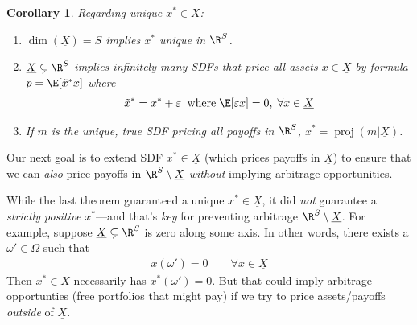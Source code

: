 \documentclass[12pt]{article}
\theoremstyle{plain}
\newtheorem{cor}[thm]{Corollary}
\theoremstyle{definition}
\theoremstyle{remark}
\newcommand{\proj}{\operatorname{proj}}
\begin{document}
\begin{multicols*}{2}
\begin{cor}
Regarding unique $x^*\in \underline{X}$:
\begin{enumerate}[label=\emph{(\roman*)}]
  \item $\dim(\underline{X})=S$ implies $x^*$ unique in $\R^S$.
  \item $\underline{X}\subsetneq \R^S$ implies infinitely many
    SDFs that price all assets $x\in\underline{X}$ by
    formula $p=\E[\tilde{x}^*x]$ where
    \begin{align*}
      \tilde{x}^*
      = x^* + \varepsilon
      \;\;
      \text{where}\;
      \E[\varepsilon x] = 0,
      \; \forall x\in\underline{X}
    \end{align*}
  \item If $m$ is the unique, true SDF pricing all payoffs in $\R^S$,
    $x^*=\proj(m|\underline{X})$.
\end{enumerate}
\end{cor}


\clearpage

Our next goal is to extend SDF $x^*\in\underline{X}$ (which prices
payoffs in $\underline{X}$) to ensure that we can \emph{also} price
payoffs in $\R^S\setminus\underline{X}$ \emph{without} implying
arbitrage opportunities.

While the last theorem guaranteed a unique $x^*\in\underline{X}$, it
did \emph{not} guarantee a \emph{strictly positive} $x^*$---and that's
\emph{key} for preventing arbitrage $\R^S\setminus\underline{X}$.
For example, suppose $\underline{X}\subsetneq\R^S$ is zero along
some axis. In other words, there exists a $\omega'\in\Omega$ such that
\begin{align*}
  x(\omega') = 0
  \qquad \forall x\in \underline{X}
\end{align*}
Then $x^*\in\underline{X}$ necessarily has $x^*(\omega')=0$.
But that could imply arbitrage opportunties (free portfolios that might
pay) if we try to price assets/payoffs \emph{outside} of
$\underline{X}$.


\end{multicols*}
\end{document}
